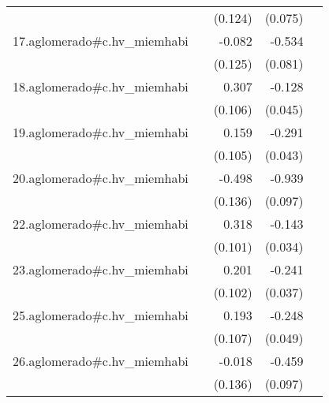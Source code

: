 {\begin{longtable}{l*{4}{D{.}{.}{-1}}}
            &                     &     (0.124)         &     (0.075)         &                     \\
\addlinespace
17.aglomerado#c.hv\_miemhabi&                     &      -0.082         &      -0.534\sym{***}&                     \\
            &                     &     (0.125)         &     (0.081)         &                     \\
\addlinespace
18.aglomerado#c.hv\_miemhabi&                     &       0.307\sym{**} &      -0.128\sym{**} &                     \\
            &                     &     (0.106)         &     (0.045)         &                     \\
\addlinespace
19.aglomerado#c.hv\_miemhabi&                     &       0.159         &      -0.291\sym{***}&                     \\
            &                     &     (0.105)         &     (0.043)         &                     \\
\addlinespace
20.aglomerado#c.hv\_miemhabi&                     &      -0.498\sym{***}&      -0.939\sym{***}&                     \\
            &                     &     (0.136)         &     (0.097)         &                     \\
\addlinespace
22.aglomerado#c.hv\_miemhabi&                     &       0.318\sym{**} &      -0.143\sym{***}&                     \\
            &                     &     (0.101)         &     (0.034)         &                     \\
\addlinespace
23.aglomerado#c.hv\_miemhabi&                     &       0.201\sym{*}  &      -0.241\sym{***}&                     \\
            &                     &     (0.102)         &     (0.037)         &                     \\
\addlinespace
25.aglomerado#c.hv\_miemhabi&                     &       0.193         &      -0.248\sym{***}&                     \\
            &                     &     (0.107)         &     (0.049)         &                     \\
\addlinespace
26.aglomerado#c.hv\_miemhabi&                     &      -0.018         &      -0.459\sym{***}&                     \\
            &                     &     (0.136)         &     (0.097)         &                     \\

\end{longtable}}
